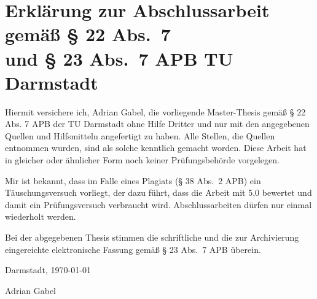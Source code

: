 
\thispagestyle{empty}
\section*{Erklärung zur Abschlussarbeit gemäß § 22 Abs.\@~7 \\und § 23 Abs.\@~7 APB TU Darmstadt}

Hiermit versichere ich, Adrian Gabel, die vorliegende Master-Thesis gemäß § 22 Abs. 7 APB der TU Darmstadt ohne Hilfe Dritter und nur mit den angegebenen Quellen und Hilfsmitteln angefertigt zu haben. Alle Stellen, die Quellen entnommen wurden, sind als solche kenntlich gemacht worden. Diese Arbeit hat in gleicher oder ähnlicher Form noch keiner Prüfungsbehörde vorgelegen. 

Mir ist bekannt, dass im Falle eines Plagiats (§ 38 Abs.\@~2 APB) ein Täuschungsversuch vorliegt, der dazu führt, dass die Arbeit mit 5,0 bewertet und damit ein Prüfungsversuch verbraucht wird. Abschlussarbeiten dürfen nur einmal wiederholt werden.

Bei der abgegebenen Thesis stimmen die schriftliche und die zur Archivierung eingereichte elektronische Fassung gemäß § 23 Abs.\@~7 APB überein.

%
%
%
\vspace{20pt}


\noindent
Darmstadt, \today\vspace{80pt}


\noindent
Adrian Gabel


